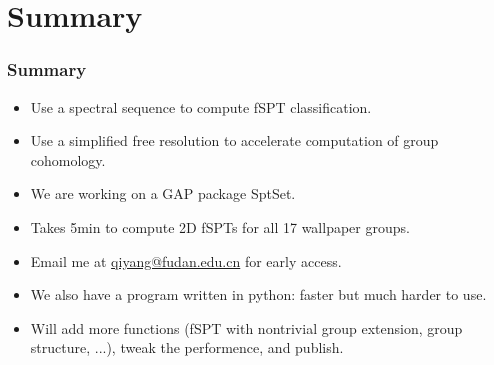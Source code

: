 \documentclass[xcolor=table, aspectratio=169]{beamer}
\begin{document}
\section{Summary}

\begin{frame}
	\frametitle{Summary}
	\begin{itemize}
		\item Use a spectral sequence to compute fSPT classification.
		\item Use a simplified free resolution to accelerate computation of group cohomology.
		\item We are working on a GAP package SptSet.
		\item Takes 5min to compute 2D fSPTs for all 17 wallpaper groups.
		\item Email me at \url{qiyang@fudan.edu.cn} for early access.
		\item We also have a program written in python: faster but much harder to use.
		\item Will add more functions (fSPT with nontrivial group extension, group structure, ...), tweak the performence, and publish.
	\end{itemize}
\end{frame}
\end{document}
